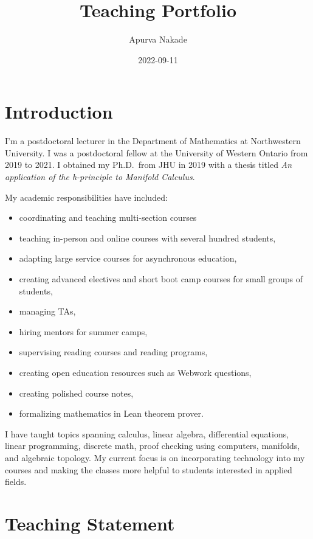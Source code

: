 \documentclass[
]{report}
\title{Teaching Portfolio}
\author{Apurva Nakade}
\date{2022-09-11}
\providecommand{\tightlist}{%
  \setlength{\itemsep}{0pt}\setlength{\parskip}{0pt}}
\begin{document}
\maketitle

\thispagestyle{empty}

{
\setcounter{tocdepth}{2}
\tableofcontents
}
\hypertarget{introduction}{%
\chapter*{Introduction}\label{introduction}}


I'm a postdoctoral lecturer in the Department of Mathematics at Northwestern
University. I was a postdoctoral fellow at the University of Western
Ontario from 2019 to 2021. I obtained my Ph.D.~from JHU in 2019 with a thesis titled \emph{An application of
the h-principle to Manifold Calculus}.

My academic responsibilities have included:

\begin{itemize}
\tightlist
\item
  coordinating and teaching multi-section courses
\item
  teaching in-person and online courses with several hundred students,
\item
  adapting large service courses for asynchronous education,
\item
  creating advanced electives and short boot camp courses for small groups of students,
\item
  managing TAs,
\item
  hiring mentors for summer camps,
\item
  supervising reading courses and reading programs,
\item
  creating open education resources such as Webwork questions,
\item
  creating polished course notes,
\item
  formalizing mathematics in Lean theorem prover.
\end{itemize}

I have taught topics spanning calculus, linear algebra, differential equations, linear programming, discrete math, proof checking using computers, manifolds, and algebraic topology.
My current focus is on incorporating technology into my courses and making the classes more helpful to students interested in applied fields.

\hypertarget{teaching-statement}{%
\chapter{Teaching Statement}\label{teaching-statement}}
\end{document}
